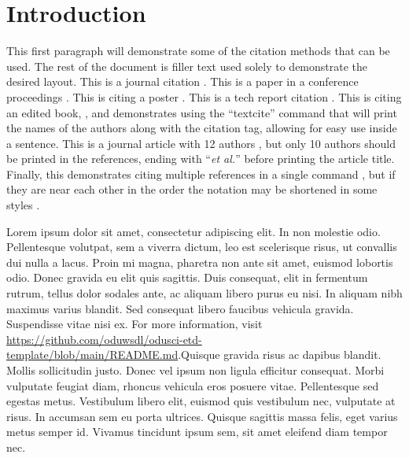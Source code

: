 \chapter{Introduction} 
This first paragraph will demonstrate some of the citation methods that can be used. The rest of the document is filler text used solely to demonstrate the desired layout.  This is a journal citation \autocite{berlin-tweb23}. This is a paper in a conference proceedings \autocite{weigle-jcdl23}. This is citing a poster \autocite{jayanetti-sbp23}. This is a tech report citation \autocite{weigle-2023}. This is citing an edited book, \textcite{vanet-book}, and demonstrates using the ``textcite'' command that will print the names of the authors along with the citation tag, allowing for easy use inside a sentence.  This is a journal article with 12 authors \autocite{coifman2005geometric}, but only 10 authors should be printed in the references, ending with ``\emph{et al.}'' before printing the article title.  Finally, this  demonstrates citing multiple references in a single command \autocites{jones-memento21,vanet-book,weigle-jcdl23}, but if they are near each other in the order the notation may be shortened in some styles \autocites{berlin-tweb23, coifman2005geometric, jayanetti-sbp23}.

Lorem ipsum dolor sit amet, consectetur adipiscing elit. In non molestie odio. Pellentesque volutpat, sem a viverra dictum, leo est scelerisque risus, ut convallis dui nulla a lacus. Proin mi magna, pharetra non ante sit amet, euismod lobortis odio. Donec gravida eu elit quis sagittis. Duis consequat, elit in fermentum rutrum, tellus dolor sodales ante, ac aliquam libero purus eu nisi. In aliquam nibh maximus varius blandit. Sed consequat libero faucibus vehicula gravida. Suspendisse vitae nisi ex. For more information, visit \url{https://github.com/oduwsdl/odusci-etd-template/blob/main/README.md}.Quisque gravida risus ac dapibus blandit. Mollis sollicitudin justo. Donec vel ipsum non ligula efficitur consequat. Morbi vulputate feugiat diam, rhoncus vehicula eros posuere vitae. Pellentesque sed egestas metus. Vestibulum libero elit, euismod quis vestibulum nec, vulputate at risus. In accumsan sem eu porta ultrices. Quisque sagittis massa felis, eget varius metus semper id. Vivamus tincidunt ipsum sem, sit amet eleifend diam tempor nec.

